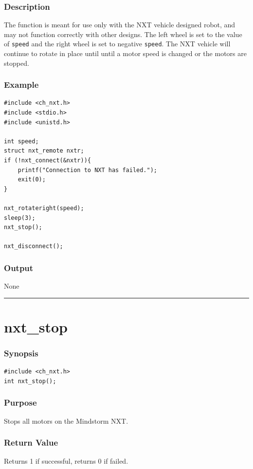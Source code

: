 \documentclass[12pt]{article}
\begin{document}
\subsubsection*{Description}
The function is meant for use only with the NXT vehicle designed robot, 
and may not function correctly with other designs. The left wheel is 
set to the value of \verb+speed+ and the right wheel is set to 
negative \verb+speed+.  The NXT vehicle will continue to rotate in 
place until until a motor speed is changed or the motors are stopped.

\subsubsection*{Example}
\begin{verbatim}
#include <ch_nxt.h> 
#include <stdio.h>
#include <unistd.h>

int speed;
struct nxt_remote nxtr;
if (!nxt_connect(&nxtr)){
    printf("Connection to NXT has failed.");
    exit(0);
}
    
nxt_rotateright(speed);
sleep(3);
nxt_stop();

nxt_disconnect();
\end{verbatim}

\subsubsection*{Output}
None 
\\

\hrule
\newpage

\section*{nxt\_stop}

\subsubsection*{Synopsis}
\begin{verbatim}
#include <ch_nxt.h>
int nxt_stop();
\end{verbatim}

\subsubsection*{Purpose}
Stops all motors on the Mindstorm NXT.

\subsubsection*{Return Value}
Returns 1 if successful, returns 0 if failed.
\end{document}
